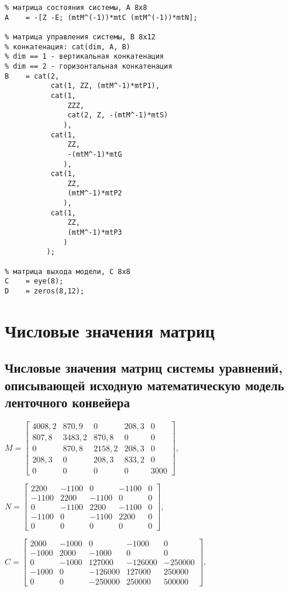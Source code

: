 \begin{verbatim}
% матрица состояния системы, А 8x8
A    = -[Z -E; (mtM^(-1))*mtC (mtM^(-1))*mtN];

% матрица управления системы, В 8x12
% конкатенация: cat(dim, A, B)
% dim == 1 - вертикальная конкатенация
% dim == 2 - горизонтальная конкатенация
B    = cat(2,
           cat(1, ZZ, (mtM^-1)*mtP1),
           cat(1, 
               ZZZ,
               cat(2, Z, -(mtM^-1)*mtS)
              ),
           cat(1, 
               ZZ, 
               -(mtM^-1)*mtG
              ),
           cat(1,
               ZZ,
               (mtM^-1)*mtP2
              ),
           cat(1, 
               ZZ,
               (mtM^-1)*mtP3
              )
          );

% матрица выхода модели, С 8x8
C    = eye(8);
D    = zeros(8,12);
\end{verbatim}

\chapter{Числовые значения матриц} \label{Appendix1}
\section{Числовые значения матриц системы уравнений, описывающей исходную математическую модель ленточного конвейера}\label{Appendix11}

$ 
M = 
\begin{bmatrix}
	4008,2 & 870,9  & 0      & 208,3 & 0    \\
	807,8  & 3483,2 & 870,8  & 0     & 0    \\
	0      & 870,8  & 2158,2 & 208,3 & 0    \\
	208,3  & 0      & 208,3  & 833,2 & 0    \\
	0      & 0      & 0      & 0     & 3000
\end{bmatrix},
$
\bigskip

$
N = 
\begin{bmatrix}
	2200  & -1100 & 0     & -1100 & 0       \\
	-1100 & 2200  & -1100 & 0     & 0       \\
	0     & -1100 & 2200  & -1100 & 0       \\
	-1100 & 0     & -1100 & 2200  & 0       \\
	0     & 0     & 0     & 0     & 0
\end{bmatrix},
$
\bigskip

$ 
C = 
\begin{bmatrix}
	2000  & -1000 & 0       & -1000   & 0       \\
	-1000 & 2000  & -1000   & 0       & 0       \\
	0     & -1000 & 127000  & -126000 & -250000 \\
	-1000 & 0     & -126000 & 127000  & 250000  \\
	0     & 0     & -250000 &  250000 & 500000
\end{bmatrix},
$
\bigskip

